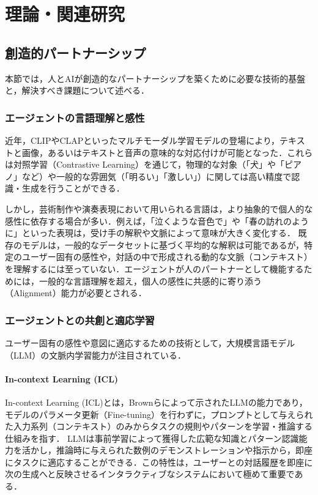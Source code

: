 \chapter{理論・関連研究}
\label{chap:理論・関連研究}

\section{創造的パートナーシップ}
\label{sec:創造的パートナーシップ}

本節では，人とAIが創造的なパートナーシップを築くために必要な技術的基盤と，解決すべき課題について述べる．

\subsection{エージェントの言語理解と感性}
\label{subsec:エージェントの言語理解}

近年，CLIP\cite{clip}やCLAP\cite{clap}といったマルチモーダル学習モデルの登場により，テキストと画像，あるいはテキストと音声の意味的な対応付けが可能となった．これらは対照学習（Contrastive Learning）を通じて，物理的な対象（「犬」や「ピアノ」など）や一般的な雰囲気（「明るい」「激しい」）に関しては高い精度で認識・生成を行うことができる．

しかし，芸術制作や演奏表現において用いられる言語は，より抽象的で個人的な感性に依存する場合が多い．例えば，「泣くような音色で」や「春の訪れのように」といった表現は，受け手の解釈や文脈によって意味が大きく変化する．
既存のモデルは，一般的なデータセットに基づく平均的な解釈は可能であるが，特定のユーザー固有の感性や，対話の中で形成される動的な文脈（コンテキスト）を理解するには至っていない．エージェントが人のパートナーとして機能するためには，一般的な言語理解を超え，個人の感性に共感的に寄り添う（Alignment）能力が必要とされる．

\subsection{エージェントとの共創と適応学習}
\label{subsec:エージェントとの共創}

ユーザー固有の感性や意図に適応するための技術として，大規模言語モデル（LLM）の文脈内学習能力が注目されている．

\subsubsection{In-context Learning (ICL)}
\label{subsubsec:In-context Learning}
In-context Learning (ICL)\cite{ICL}とは，Brownらによって示されたLLMの能力であり，モデルのパラメータ更新（Fine-tuning）を行わずに，プロンプトとして与えられた入力系列（コンテキスト）のみからタスクの規則やパターンを学習・推論する仕組みを指す．
LLMは事前学習によって獲得した広範な知識とパターン認識能力を活かし，推論時に与えられた数例のデモンストレーションや指示から，即座にタスクに適応することができる．この特性は，ユーザーとの対話履歴を即座に次の生成へと反映させるインタラクティブなシステムにおいて極めて重要である．


